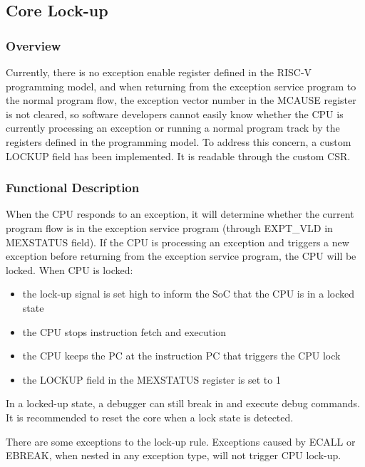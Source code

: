 \documentclass[main\_\_EN.tex]{subfiles}
\begin{document}

\subsection{Core Lock-up}
\label{sec:riscvcpu-custom-lockup-features}
\subsubsection{Overview}
\label{sec:riscvcpu-custom-lockup-overview}
Currently, there is no exception enable register defined in the RISC-V programming model, and when returning from the exception service program to the normal program flow, the exception vector number in the MCAUSE register is not cleared, so software developers cannot easily know whether the CPU is currently processing an exception or running a normal program track by the registers defined in the programming model. To address this concern, a custom LOCKUP field has been implemented. It is readable through the custom CSR.

\subsubsection{Functional Description}
\label{sec:riscvcpu-custom-lockup-feature-func-descr}
When the CPU responds to an exception, it will determine whether the current program flow is in the exception service program (through EXPT\_VLD in MEXSTATUS field). If the CPU is processing an exception and triggers a new exception before returning from the exception service program, the CPU will be locked. When CPU is locked:

\begin{itemize}
    \item the lock-up signal is set high to inform the SoC that the CPU is in a locked state
    \item the CPU stops instruction fetch and execution
    \item the CPU keeps the PC at the instruction PC that triggers the CPU lock
    \item the LOCKUP field in the MEXSTATUS register is set to 1
\end{itemize}

In a locked-up state, a debugger can still break in and execute debug commands. It is recommended to reset the core when a lock state is detected.

There are some exceptions to the lock-up rule. Exceptions caused by ECALL or EBREAK, when nested in any exception type, will not trigger CPU lock-up.
\end{document}
